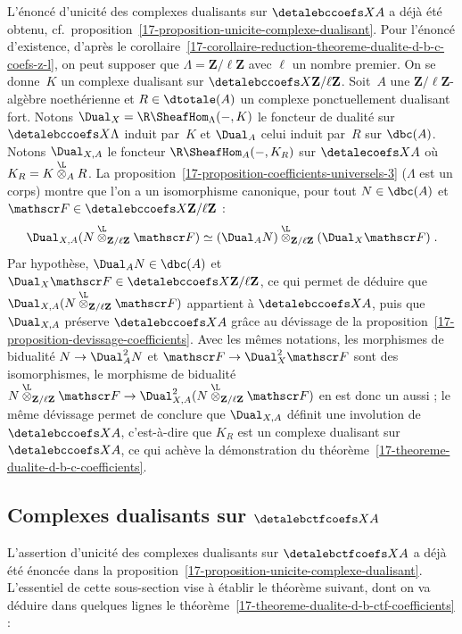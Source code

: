 \documentclass[10pt]{../fichiers-configuration-latex/smfart}
\begin{document}
L'énoncé d'unicité des complexes dualisants sur $\detalebccoefs X A$
a déjà été obtenu,
cf.~proposition~\ref{17-proposition-unicite-complexe-dualisant}.
Pour l'énoncé d'existence, d'après le
corollaire~\ref{17-corollaire-reduction-theoreme-dualite-d-b-c-coefs-z-l}, on
peut supposer que $\Lambda=\mathbf{Z}/\ell\mathbf{Z}$ avec $\ell$ un nombre
premier. On se donne $K$ un complexe dualisant sur $\detalebccoefs X
{\mathbf{Z}/\ell\mathbf{Z}}$. Soit $A$ une $\mathbf{Z}/\ell\mathbf{Z}$-algèbre
noethérienne et $R\in\dtotale(A)$ un complexe ponctuellement dualisant
fort. Notons $\Dual_X=\R\SheafHom_{\Lambda}(-,K)$ le foncteur de
dualité sur $\detalebccoefs X {\Lambda}$ induit par $K$ et $\Dual_A$ celui
induit par $R$ sur $\dbc(A)$. Notons $\Dual_{X,A}$ le
foncteur $\R\SheafHom_A(-,K_R)$ sur $\detalecoefs X A$ où
$K_R=K\overset{\L}\otimes_A R$. La
proposition~\ref{17-proposition-coefficients-universels-3} ($\Lambda$ est un
corps) montre que l'on a
un isomorphisme canonique, pour tout $N\in\dbc(A)$ et
$\mathscr F\in\detalebccoefs X {\mathbf{Z}/\ell\mathbf{Z}}$ :
\[\Dual_{X,A}(N
\overset{\L}\otimes_{\mathbf{Z}/\ell\mathbf{Z}} \mathscr F)\simeq
(\Dual_A
N)\overset{\L}\otimes_{\mathbf{Z}/\ell\mathbf{Z}}(\Dual_X\mathscr F)\;
\text{.}\]
Par hypothèse, $\Dual_A N\in\dbc(A)$ et
$\Dual_X\mathscr F\in\detalebccoefs X {\mathbf{Z}/\ell\mathbf{Z}}$, ce qui
permet de déduire que $\Dual_{X,A}(N
\overset{\L}\otimes_{\mathbf{Z}/\ell\mathbf{Z}} \mathscr F)$
appartient à $\detalebccoefs X A$, puis que $\Dual_{X,A}$ préserve
$\detalebccoefs
X A$ grâce au dévissage de la
proposition~\ref{17-proposition-devissage-coefficients}.
Avec les mêmes notations, les morphismes de bidualité $N\to\Dual_A^2N$
et $\mathscr F\to\Dual_X^2\mathscr F$ sont des isomorphismes, le morphisme
de bidualité $N
\overset{\L}\otimes_{\mathbf{Z}/\ell\mathbf{Z}} \mathscr
F\to\Dual_{X,A}^2(
N
\overset{\L}\otimes_{\mathbf{Z}/\ell\mathbf{Z}} \mathscr F)$ en est
donc un aussi ; le même dévissage permet de conclure que $\Dual_{X,A}$
définit
une involution de $\detalebccoefs X A$, c'est-à-dire que $K_R$ est un complexe
dualisant sur $\detalebccoefs X A$, ce qui achève la démonstration du
théorème~\ref{17-theoreme-dualite-d-b-c-coefficients}.

\subsection{Complexes dualisants sur \texorpdfstring{$\detalebctfcoefs X A$}{Dbctf(X,A)}}%

L'assertion d'unicité des complexes dualisants sur $\detalebctfcoefs X A$ a
déjà été énoncée dans la
proposition~\ref{17-proposition-unicite-complexe-dualisant}. L'essentiel de
cette sous-section vise à établir le théorème suivant, dont on va déduire
dans quelques lignes le
théorème~\ref{17-theoreme-dualite-d-b-ctf-coefficients} :
\end{document}
